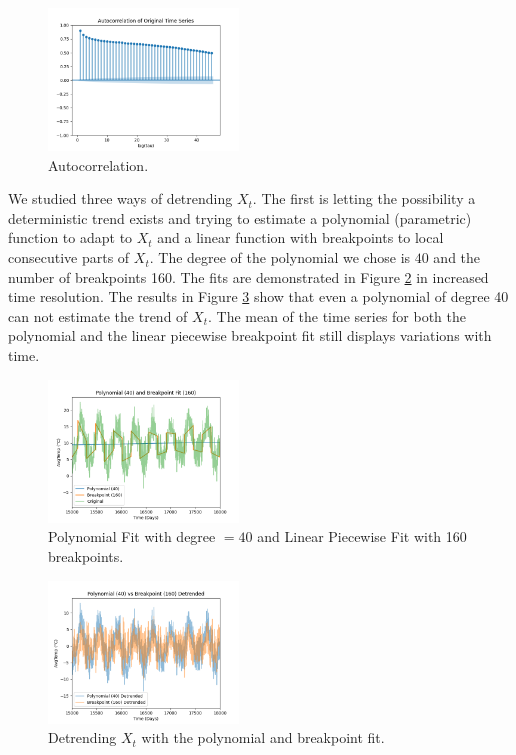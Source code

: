 \documentclass[conference]{IEEEtran}
\begin{document}
\begin{figure}[ht]
    \centering
    \includegraphics[width=0.45\textwidth]{Figures/Autocorrelation of Original Time Series.png}
    \caption{Autocorrelation.}
    \label{tempcf}
\end{figure}

We studied three ways of detrending $X_t$. The first is letting the possibility a deterministic trend exists and trying to estimate a polynomial (parametric) function to adapt to $X_t$ and a linear function with breakpoints to local consecutive parts of $X_t$. The degree of the polynomial we chose is $40$ and the number of breakpoints 160. The fits are demonstrated in Figure \ref{airpolbr} in increased time resolution. The results in Figure \ref{airbrpol} show that even a polynomial of degree 40 can not estimate the trend of $X_t$. The mean of the time series for both the polynomial and the linear piecewise breakpoint fit still displays variations with time. 
\vspace{10mm}

\begin{figure}[ht]
    \centering
    \includegraphics[width=0.45\textwidth]{Figures/Polynomial (40) and Breakpoint Fit (160).png}
    \caption{Polynomial Fit with degree $= 40$ and Linear Piecewise Fit with 160 breakpoints.}
    \label{airpolbr}
\end{figure}
\vspace{15mm}

\begin{figure}[ht]
    \centering
    \includegraphics[width=0.45\textwidth]{Figures/Polynomial (40) vs Breakpoint (160) Detrended.png}
    \caption{Detrending $X_t$ with the polynomial and breakpoint fit.}
    \label{airbrpol}
\end{figure}
\vspace{15mm}
\end{document}
